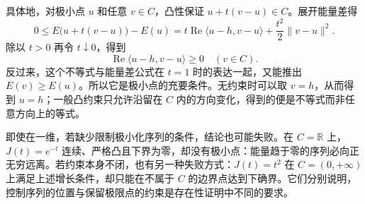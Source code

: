 \ProseParagraphBreak

具体地，对极小点 \(u\) 和任意 \(v\in C\)，凸性保证 \(u+t(v-u)\in C\)。展开能量差得
\[
  0\leq E\bigl(u+t(v-u)\bigr)-E(u)
  =t\operatorname{Re}\langle u-h,v-u\rangle
    +\frac{t^2}{2}\|v-u\|^2.
\]
除以 \(t>0\) 再令 \(t\downarrow0\)，得到
\[
  \operatorname{Re}\langle u-h,v-u\rangle\geq0
  \quad(v\in C).
\]
反过来，这个不等式与能量差公式在 \(t=1\) 时的表达一起，又能推出 \(E(v)\geq E(u)\)。所以它是极小点的充要条件。无约束时可以取 \(v=h\)，从而得到 \(u=h\)；一般凸约束只允许沿留在 \(C\) 内的方向变化，得到的便是不等式而非任意方向上的等式。

\ProseParagraphBreak

即使在一维，若缺少限制极小化序列的条件，结论也可能失败。在 \(C=\mathbb R\) 上，\(J(t)=e^{-t}\) 连续、严格凸且下界为零，却没有极小点：能量趋于零的序列必向正无穷远离。若约束本身不闭，也有另一种失败方式：\(J(t)=t^2\) 在 \(C=(0,+\infty)\) 上满足上述增长条件，却只能在不属于 \(C\) 的边界点达到下确界。它们分别说明，控制序列的位置与保留极限点的约束是存在性证明中不同的要求。
